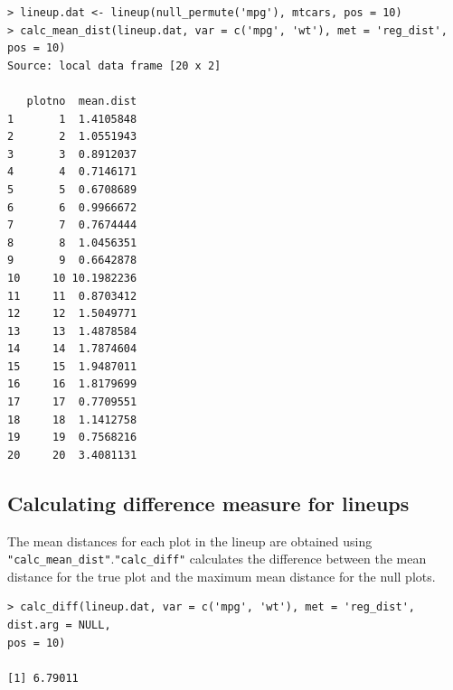 \begin{verbatim}
> lineup.dat <- lineup(null_permute('mpg'), mtcars, pos = 10)
> calc_mean_dist(lineup.dat, var = c('mpg', 'wt'), met = 'reg_dist', pos = 10)
Source: local data frame [20 x 2]

   plotno  mean.dist
1       1  1.4105848
2       2  1.0551943
3       3  0.8912037
4       4  0.7146171
5       5  0.6708689
6       6  0.9966672
7       7  0.7674444
8       8  1.0456351
9       9  0.6642878
10     10 10.1982236
11     11  0.8703412
12     12  1.5049771
13     13  1.4878584
14     14  1.7874604
15     15  1.9487011
16     16  1.8179699
17     17  0.7709551
18     18  1.1412758
19     19  0.7568216
20     20  3.4081131
\end{verbatim}

\subsection{Calculating difference measure for
lineups}\label{calculating-difference-measure-for-lineups}

The mean distances for each plot in the lineup are obtained using
\texttt{"calc\_mean\_dist"}.\texttt{"calc\_diff"} calculates the
difference between the mean distance for the true plot and the maximum
mean distance for the null plots.

%

\begin{verbatim}
> calc_diff(lineup.dat, var = c('mpg', 'wt'), met = 'reg_dist', dist.arg = NULL, 
pos = 10)

[1] 6.79011
\end{verbatim}


